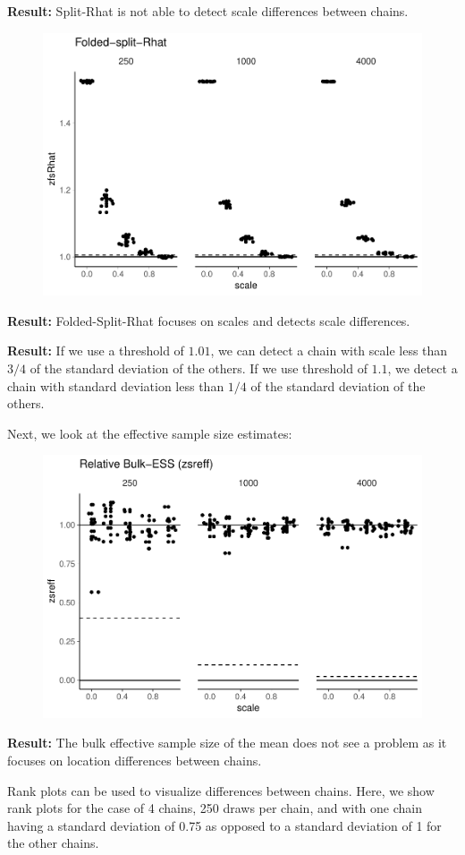 \documentclass[american,]{article}
\begin{document}
\textbf{Result:} Split-Rhat is not able to detect scale differences
between chains.

\begin{figure}[tp]
  \centering
  \includegraphics[width=0.6\linewidth]{graphics/zfsrhat-scaled-chain-1.pdf}
\end{figure}

\textbf{Result:} Folded-Split-Rhat focuses on scales and detects scale
differences.

\textbf{Result:} If we use a threshold of \(1.01\), we can detect a
chain with scale less than \(3/4\) of the standard deviation of the
others. If we use threshold of \(1.1\), we detect a chain with standard
deviation less than \(1/4\) of the standard deviation of the others.

Next, we look at the effective sample size estimates:

\begin{figure}[tp]
  \centering
  \includegraphics[width=0.6\linewidth]{graphics/zsreff-scaled-chain-1.pdf}
\end{figure}

\textbf{Result:} The bulk effective sample size of the mean does not see
a problem as it focuses on location differences between chains.

Rank plots can be used to visualize differences between chains. Here, we
show rank plots for the case of 4 chains, 250 draws per chain, and with
one chain having a standard deviation of 0.75 as opposed to a standard
deviation of 1 for the other chains.
\end{document}
